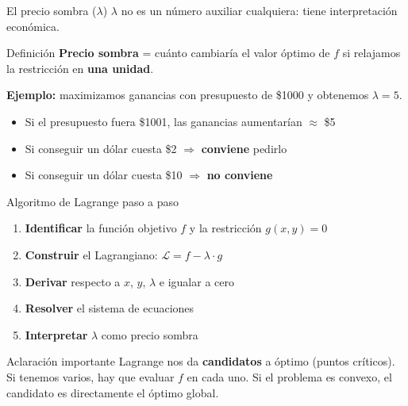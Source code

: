 \documentclass{beamer}
\begin{document}
\begin{frame}{El precio sombra ($\lambda$)}
    \small
    $\lambda$ no es un número auxiliar cualquiera: tiene interpretación económica.

    \vspace{0.5em}

    \begin{alertblock}{Definición}
        \textbf{Precio sombra} = cuánto cambiaría el valor óptimo de $f$ si relajamos la restricción en \textbf{una unidad}.
    \end{alertblock}

    \vspace{0.8em}

    \textbf{Ejemplo:} maximizamos ganancias con presupuesto de \$1000 y obtenemos $\lambda = 5$.
    \begin{itemize}
        \item Si el presupuesto fuera \$1001, las ganancias aumentarían $\approx$ \$5
        \item Si conseguir un dólar cuesta \$2 $\Rightarrow$ \textbf{conviene} pedirlo
        \item Si conseguir un dólar cuesta \$10 $\Rightarrow$ \textbf{no conviene}
    \end{itemize}
\end{frame}

\begin{frame}{Algoritmo de Lagrange paso a paso}
    \small
    \begin{enumerate}
        \item \textbf{Identificar} la función objetivo $f$ y la restricción $g(x,y) = 0$
        \item \textbf{Construir} el Lagrangiano: $\mathcal{L} = f - \lambda \cdot g$
        \item \textbf{Derivar} respecto a $x$, $y$, $\lambda$ e igualar a cero
        \item \textbf{Resolver} el sistema de ecuaciones
        \item \textbf{Interpretar} $\lambda$ como precio sombra
    \end{enumerate}

    \vspace{0.8em}

    \begin{alertblock}{Aclaración importante}
        Lagrange nos da \textbf{candidatos} a óptimo (puntos críticos). Si tenemos varios, hay que evaluar $f$ en cada uno. Si el problema es convexo, el candidato es directamente el óptimo global.
    \end{alertblock}
\end{frame}
\end{document}
